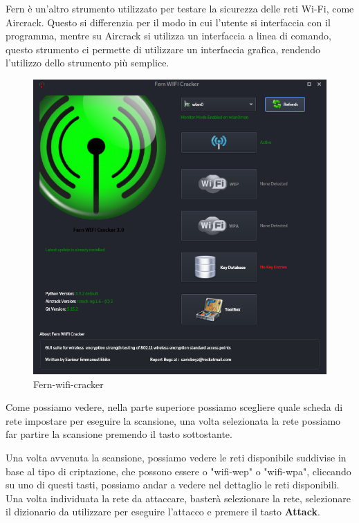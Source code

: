 Fern\cite{fern} è un'altro strumento utilizzato per testare la sicurezza delle reti Wi-Fi, come Aircrack. Questo si differenzia per il modo in cui l'utente si interfaccia con il programma, mentre su Aircrack si utilizza un interfaccia a linea di comando, questo strumento ci permette di utilizzare un interfaccia grafica, rendendo l'utilizzo dello strumento più semplice.

\begin{figure}[ht]
    \centering
    \includegraphics[width=\linewidth]{Immagini/6/fern_1.png}
    \caption{Fern-wifi-cracker}
    \label{fig:Fern example}
\end{figure}

Come possiamo vedere, nella parte superiore possiamo scegliere quale scheda di rete impostare per eseguire la scansione, una volta selezionata la rete possiamo far partire la scansione premendo il tasto sottostante.
\newpage

Una volta avvenuta la scansione, possiamo vedere le reti disponibile suddivise in base al tipo di criptazione, che possono essere o "wifi-wep" o "wifi-wpa", cliccando su uno di questi tasti, possiamo andar a vedere nel dettaglio le reti disponibili. Una volta individuata la rete da attaccare, basterà selezionare la rete, selezionare il dizionario da utilizzare per eseguire l'attacco e premere il tasto \textbf{Attack}.

